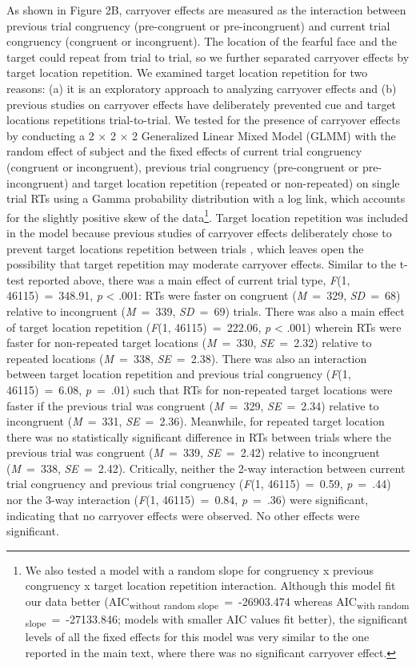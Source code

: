 \documentclass[issue,header,twocolumn,empirical, authordate,10pt]{jote-new-article}
\begin{document}
As shown in Figure 2B, carryover effects are measured as the interaction between previous trial congruency (pre-congruent or pre-incongruent) and current trial congruency (congruent or incongruent). The location of the fearful face and the target could repeat from trial to trial, so we further separated carryover effects by target location repetition. We examined target location repetition for two reasons: (a) it is an exploratory approach to analyzing carryover effects and (b) previous studies on carryover effects \parencite{Gladwin2019a} have deliberately prevented cue and target locations repetitions trial-to-trial. We tested for the presence of carryover effects by conducting a 2 × 2 × 2 Generalized Linear Mixed Model (GLMM) with the random effect of subject and the fixed effects of current trial congruency (congruent or incongruent), previous trial congruency (pre-congruent or pre-incongruent) and target location repetition (repeated or non-repeated) on single trial RTs using a Gamma probability distribution with a log link, which accounts for the slightly positive skew of the data\footnote{We also tested a model with a random slope for congruency x previous congruency x target location repetition interaction. Although this model fit our data better (AIC\textsubscript{without random slope}~=~-26903.474 whereas AIC\textsubscript{with random slope}~=~-27133.846; models with smaller AIC values fit better), the significant levels of all the fixed effects for this model was very similar to the one reported in the main text, where there was no significant carryover effect.}. Target location repetition was included in the model because previous studies of carryover effects deliberately chose to prevent target locations repetition between trials \parencite{Gladwin2019a}, which leaves open the possibility that target repetition may moderate carryover effects. Similar to the t-test reported above, there was a main effect of current trial type, \emph{F}(1, 46115)~=~348.91, \emph{p }< .001: RTs were faster on congruent (\emph{M}~=~329, \emph{SD}\emph{}~=~68) relative to incongruent (\emph{M}~=~339, \emph{SD}~=~69) trials. There was also a main effect of target location repetition (\emph{F}(1, 46115)~=~222.06, \emph{p }< .001) wherein RTs were faster for non-repeated target locations (\emph{M}\emph{}~=~330, \emph{SE}~=~2.32) relative to repeated locations (\emph{M}\emph{}~=~338, \emph{SE}~=~2.38). There was also an interaction between target location repetition and previous trial congruency (\emph{F}(1, 46115)~=~6.08, \emph{p}~=~.01) such that RTs for non-repeated target locations were faster if the previous trial was congruent (\emph{M}~=~329, \emph{SE}~=~2.34) relative to incongruent (\emph{M}~=~331, \emph{SE}~=~2.36). Meanwhile, for repeated target location there was no statistically significant difference in RTs between trials where the previous trial was congruent (\emph{M}~=~339, \emph{SE}~=~2.42) relative to incongruent (\emph{M}~=~338, \emph{SE}~=~2.42). Critically, neither the 2-way interaction between current trial congruency and previous trial congruency (\emph{F}(1, 46115)~=~0.59, \emph{p}~=~.44) nor the 3-way interaction (\emph{F}(1, 46115)~=~0.84, \emph{p}~=~.36) were significant, indicating that no carryover effects were observed. No other effects were significant.
\end{document}
